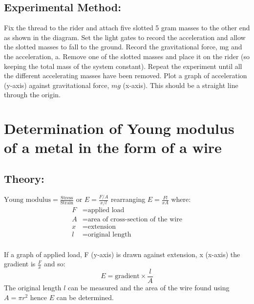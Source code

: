 \documentclass{tufte-handout}
\begin{document}
\subsection{Experimental Method:}  
Fix the thread to the rider and attach five slotted 5 gram masses to the other end as shown in the diagram. Set the light gates to record the acceleration and allow the slotted masses to fall to the ground. Record the gravitational force, mg and the acceleration, a. Remove one of the slotted masses and place it on the rider (so keeping the total mass of the system constant).   
Repeat the experiment until all the different accelerating masses have been removed. Plot a graph of acceleration (y-axis) against gravitational force, $mg$ (x-axis). This should be a straight line through the origin. 

\section{Determination of Young modulus of a metal in the form of a wire}

\subsection{Theory:}  $\text{Young modulus}  =\frac{\text{Stress}}{\text{Strain}}$  or $ E  =\frac{F/A}{x/l}$  rearranging $E =\frac{Fl}{xA}$ 
where: 
\begin{align}
       F &= \text{applied load} \\       A &= \text{area of cross-section of the wire} \\       x &= \text{extension}  \\      l &= \text{original length} \\ 
\end{align}
       
If a graph of applied load, F (y-axis) is drawn against extension, x (x-axis) the gradient is $\frac{F}{x}$ and so: \[E = \text{gradient} \times \frac{l}{A}\]     
The original length $l$ can be measured and the area of the wire found using $A= \pi r^{2}$ hence $E$ can be determined.  
\end{document}
